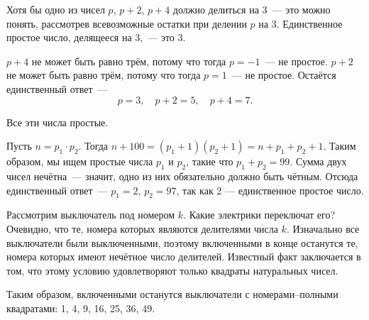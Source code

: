 \begin{itemize}

\itA Хотя бы одно из чисел $p$, $p+2$, $p+4$ должно делиться на 3~— это можно понять, рассмотрев всевозможные остатки при делении $p$ на 3. Единственное простое число, делящееся на 3,~— это 3.

$p+4$ не может быть равно трём, потому что тогда $p=-1$~— не простое. $p+2$ не может быть равно трём, потому что тогда $p=1$~— не простое. Остаётся единственный ответ~—
	$$p=3,\quad p+2 = 5,\quad p+4 = 7.$$

Все эти числа простые.

\itB Пусть $n = p_1 \cdot p_2$. Тогда $n+100 = (p_1 + 1)(p_2 + 1) = n + p_1 + p_2 + 1$. Таким образом, мы ищем простые числа $p_1$ и $p_2$, такие что $p_1 + p_2 = 99$. Сумма двух чисел нечётна~— значит, одно из них обязательно должно быть чётным. Отсюда единственный ответ~— $p_1 = 2$, $p_2 = 97$, так как 2 — единственное простое число.

\itC Рассмотрим выключатель под номером $k$. Какие электрики переключат его? Очевидно, что те, номера которых являются делителями числа $k$. Изначально все выключатели были выключенными, поэтому включенными в конце останутся те, номера которых имеют нечётное число делителей. Известный факт заключается в том, что этому условию удовлетворяют только квадраты натуральных чисел.

Таким образом, включенными останутся выключатели с номерами–полными квадратами: 1, 4, 9, 16, 25, 36, 49.
\end{itemize}